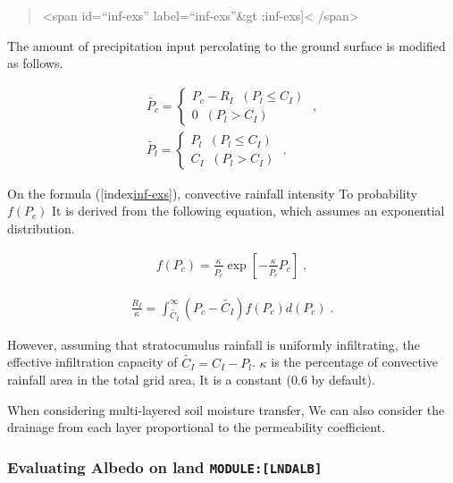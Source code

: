 \begin{quote}
\textless span id=``inf-exs'' label=``inf-exs''\&gt
;inf-exs{]}\textless{} /span\textgreater{}
\end{quote}

The amount of precipitation input percolating to the ground surface is
modified as follows.

\begin{eqnarray}
  \widetilde{P_c} = \left\{
    \begin{array}{ll}
      P_c - R_I  \;\; ( P_l \le C_I ) \\
      0             \;\; ( P_l > C_I )
    \end{array}
  \right. \; , \\
  \widetilde{P_l} = \left\{
    \begin{array}{ll}
      P_l   \;\; ( P_l \le C_I ) \\
      C_I  \;\; ( P_l > C_I )
    \end{array}
  \right. \; .
\end{eqnarray}

On the formula ({[}index\protect\hyperlink{inf-exs}{inf-exs{]}}),
convective rainfall intensity To probability \(f(P_c)\) It is derived
from the following equation, which assumes an exponential distribution.

\begin{eqnarray}
  f(P_c) = \frac{\kappa}{\overline{P_c}} 
            \exp\left[-\frac{\kappa}{\overline{P_c}}P_c\right] \; ,
\end{eqnarray}

\begin{eqnarray}
  \frac{R_I}{\kappa} = \int_{\widetilde{C_I}}^{\infty}
                        (P_c-\widetilde{C_I})f(P_c) d(P_c) \; .
\end{eqnarray}

However, assuming that stratocumulus rainfall is uniformly infiltrating,
the effective infiltration capacity of \(\widetilde{C_I} = C_I - P_l\).
\(\kappa\) is the percentage of convective rainfall area in the total
grid area, It is a constant (0.6 by default).

When considering multi-layered soil moisture transfer, We can also
consider the drainage from each layer proportional to the permeability
coefficient.

\hypertarget{evaluating-albedo-on-land-modulelndalb}{%
\subsubsection{\texorpdfstring{Evaluating Albedo on land
\texttt{MODULE:{[}LNDALB{]}}}{Evaluating Albedo on land MODULE:{[}LNDALB{]}}}\label{evaluating-albedo-on-land-modulelndalb}}

